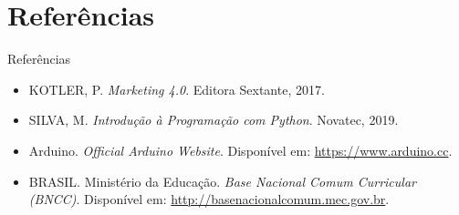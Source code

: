 \documentclass{beamer}
\begin{document}
\section{Referências}
\begin{frame}{Referências}
    \begin{itemize}
        \item KOTLER, P. \textit{Marketing 4.0}. Editora Sextante, 2017.
        \item SILVA, M. \textit{Introdução à Programação com Python}. Novatec, 2019.
        \item Arduino. \textit{Official Arduino Website}. Disponível em: \url{https://www.arduino.cc}.
        \item BRASIL. Ministério da Educação. \textit{Base Nacional Comum Curricular (BNCC)}. Disponível em: \url{http://basenacionalcomum.mec.gov.br}.
    \end{itemize}
\end{frame}
\end{document}
